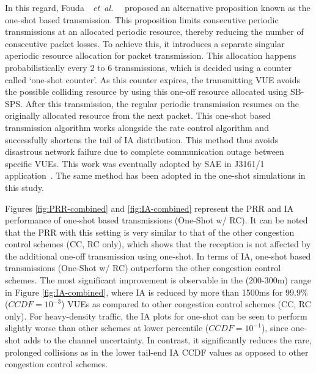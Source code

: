 \documentclass[iicol]{sn-jnl}%
\theoremstyle{thmstyleone}%
\theoremstyle{thmstyletwo}%
\theoremstyle{thmstylethree}%
\def\etal{\emph{~et~al. }}
\begin{document}
In this regard, Fouda\mbox{~\etal~\cite{fouda2021interleaved}} proposed an alternative proposition known as the one-shot based transmission. This proposition limits consecutive periodic transmissions at an allocated periodic resource, thereby reducing the number of consecutive packet losses. To achieve this, it introduces a separate singular aperiodic resource allocation for packet transmission. This allocation happens  probabilistically every  2 to 6 transmissions, which is decided using a counter called `one-shot counter'. As this counter expires, the transmitting VUE avoids the possible colliding resource by using this one-off resource allocated using SB-SPS. After this transmission, the regular periodic transmission resumes on the originally allocated resource from the next packet. This one-shot based transmission algorithm works alongside the rate control  algorithm and successfully shortens the tail of IA distribution. This method thus avoids disastrous network failure due to complete communication outage between specific VUEs. This work was eventually adopted by SAE in J3161/1 application\mbox{~\cite{saej3161}}. The same method has been adopted in the one-shot simulations in this study.


Figures \ref{fig:PRR-combined} and \ref{fig:IA-combined} represent the PRR and IA performance of one-shot based transmissions (One-Shot w/ RC). It can be noted that the PRR with this setting is very similar to that of the other congestion control schemes (CC, RC only), which shows that the reception is not affected by the additional one-off transmission using one-shot. In terms of IA, one-shot based transmissions (One-Shot w/ RC) outperform the other congestion control schemes. The most significant improvement is observable in the (200-300m) range in Figure \ref{fig:IA-combined}, where IA is reduced by more than 1500ms for 99.9\% ($CCDF = 10^{-3}$) VUEs as compared to other congestion control schemes (CC, RC only). For heavy-density traffic, the IA plots for one-shot can be seen to perform slightly worse than other schemes at lower percentile ($CCDF = 10^{-1}$), since one-shot adds to the channel uncertainty. In contrast, it significantly reduces the rare, prolonged collisions as in the lower tail-end IA CCDF values as opposed to other congestion control schemes.
\end{document}
